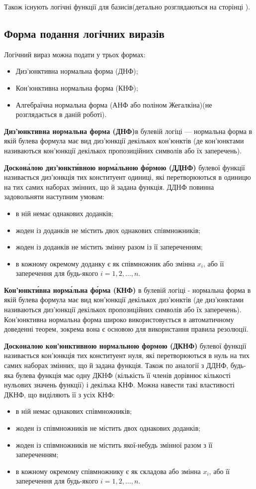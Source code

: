 Також існують логічні функції для базисів(детально розглядаються на сторінці  \pageref{subsect:logic_basis}).
\newpage
\subsection{Форма подання логічних виразів}
Логічний вираз можна подати у трьох формах:
\begin{itemize}
	\item Диз'юнктивна нормальна форма (ДНФ);
	\item Кон'юнктивна нормальна форма (КНФ);
	\item Алгебраїчна нормальна форма (АНФ або поліном Жегалкіна)(не розглядається в даній роботі).
\end{itemize}

\textbf{Диз'юнктивна нормальна форма (ДНФ)}в булевій логіці — нормальна форма 	в якій булева формула має вид диз'юнкції декількох кон'юнктів (де кон'юнктами 			називаються кон'юнкції декількох пропозиційних символів або їх заперечень).
	
\textbf{Доскона́лою диз'юнкти́вною норма́льною фо́рмою (ДДНФ)} булевої функції 				називається диз'юнкція тих конституент одиниці, які перетворюються в одиницю на тих 	самих наборах змінних, що й задана функція. ДДНФ повинна задовольняти наступним 		умовам:
\begin{itemize}
\item в ній немає однакових доданків;
\item жоден із доданків не містить двох однакових співмножників;
\item жоден із доданків не містить змінну разом із її запереченням;
\item в кожному окремому доданку є як співмножник або змінна $x_{i}$, або її заперечення для будь-якого $i = 1, 2, …, n$.
\end{itemize}

\textbf{Кон'юнкти́вна норма́льна фо́рма (КНФ)} в булевій логіці - нормальна форма в якій булева формула має вид кон'юнкції декількох диз'юнктів (де диз'юнктами називаються диз'юнкції декількох пропозиційних символів або їх заперечень). Кон'юнктивна нормальна форма широко використовується в автоматичному доведенні теорем, зокрема вона є основою для використання правила резолюції.

\textbf{Досконалою кон’юнктивною нормальною формою (ДКНФ)} булевої функції називається кон’юнкція тих конституент нуля, які перетворюються в нуль на тих самих наборах змінних, що й задана функція. Також по аналогії з ДДНФ, будь-яка булева функція має одну ДКНФ (кількість її членів дорівнює кількості нульових значень функції) і декілька КНФ. Можна навести такі властивості ДКНФ, що виділяють її з усіх КНФ:
\begin{itemize}
\item в ній немає однакових співмножників;
\item жоден із співмножників не містить двох однакових доданків;
\item жоден із співмножників не містить якої-небудь змінної разом з її запереченням;
\item в кожному окремому співмножнику є як складова або змінна $x_{i}$, або її заперечення для будь-якого $i=1,2,…,n$.
\end{itemize}
